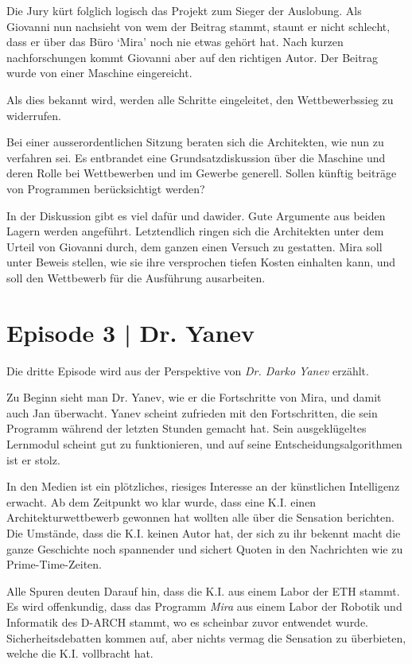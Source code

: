\documentclass[11pt,a4paper,ngerman]{scrreprt}
\begin{document}
Die Jury kürt folglich logisch das Projekt zum Sieger der Auslobung. Als
Giovanni nun nachsieht von wem der Beitrag stammt, staunt er nicht schlecht,
dass er über das Büro `Mira' noch nie etwas gehört hat. Nach kurzen
nachforschungen kommt Giovanni aber auf den richtigen Autor. Der Beitrag wurde
von einer Maschine eingereicht.

Als dies bekannt wird, werden alle Schritte eingeleitet, den Wettbewerbssieg zu
widerrufen.

Bei einer ausserordentlichen Sitzung beraten sich die Architekten, wie nun zu
verfahren sei. Es entbrandet eine Grundsatzdiskussion über die Maschine und
deren Rolle bei Wettbewerben und im Gewerbe generell. Sollen künftig beiträge
von Programmen berücksichtigt werden?

In der Diskussion gibt es viel dafür und dawider. Gute Argumente aus beiden
Lagern werden angeführt. Letztendlich ringen sich die Architekten unter dem
Urteil von Giovanni durch, dem ganzen einen Versuch zu gestatten. Mira soll
unter Beweis stellen, wie sie ihre versprochen tiefen Kosten einhalten kann, und
soll den Wettbewerb für die Ausführung ausarbeiten.

\section*{Episode 3 | Dr. Yanev}

Die dritte Episode wird aus der Perspektive von \emph{Dr. Darko Yanev} erzählt.

Zu Beginn sieht man Dr. Yanev, wie er die Fortschritte von Mira, und damit auch
Jan überwacht. Yanev scheint zufrieden mit den Fortschritten, die sein Programm
während der letzten Stunden gemacht hat. Sein ausgeklügeltes Lernmodul scheint
gut zu funktionieren, und auf seine Entscheidungsalgorithmen ist er stolz.

In den Medien ist ein plötzliches, riesiges Interesse an der künstlichen
Intelligenz erwacht. Ab dem Zeitpunkt wo klar wurde, dass eine K.I. einen
Architekturwettbewerb gewonnen hat wollten alle über die Sensation
berichten. Die Umstände, dass die K.I. keinen Autor hat, der sich zu ihr bekennt
macht die ganze Geschichte noch spannender und sichert Quoten in den Nachrichten
wie zu Prime-Time-Zeiten.

Alle Spuren deuten Darauf hin, dass die K.I. aus einem Labor der ETH stammt. Es
wird offenkundig, dass das Programm \emph{Mira} aus einem Labor der Robotik und
Informatik des D-ARCH stammt, wo es scheinbar zuvor entwendet
wurde. Sicherheitsdebatten kommen auf, aber nichts vermag die Sensation zu
überbieten, welche die K.I. vollbracht hat.
\end{document}
